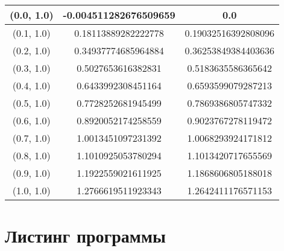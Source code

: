 \begin{table}[H]
\begin{tabular}{|c|c|c|}
\hline
(0.0, 1.0) & -0.004511282676509659 & 0.0 \\
\hline
(0.1, 1.0) & 0.18113889282222778 & 0.19032516392808096 \\
\hline
(0.2, 1.0) & 0.34937774685964884 & 0.36253849384403636 \\
\hline
(0.3, 1.0) & 0.5027653616382831 & 0.5183635586365642 \\
\hline
(0.4, 1.0) & 0.6433992308451164 & 0.6593599079287213 \\
\hline
(0.5, 1.0) & 0.7728252681945499 & 0.7869386805747332 \\
\hline
(0.6, 1.0) & 0.8920052174258559 & 0.9023767278119472 \\
\hline
(0.7, 1.0) & 1.0013451097231392 & 1.0068293924171812 \\
\hline
(0.8, 1.0) & 1.1010925053780294 & 1.1013420717655569 \\
\hline
(0.9, 1.0) & 1.1922559021611925 & 1.1868606805188018 \\
\hline
(1.0, 1.0) & 1.2766619511923343 & 1.2642411176571153 \\
\hline
\end{tabular}
\end{table}
\normalsize

\chapter{Листинг программы}
\scriptsize

\normalsize

